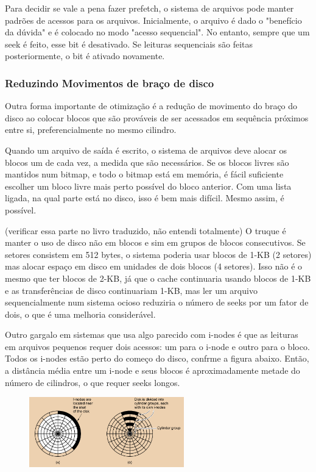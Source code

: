 \documentclass{article}
\begin{document}
Para decidir se vale a pena fazer prefetch, o sistema de arquivos pode manter padrões de acessos para os arquivos. Inicialmente, o arquivo é dado o "benefício da dúvida" e é colocado no modo "acesso sequencial". No entanto, sempre que um seek é feito, esse bit é desativado. Se leituras sequenciais são feitas posteriormente, o bit é ativado novamente.

\subsubsection{Reduzindo Movimentos de braço de disco}

Outra forma importante de otimização é a redução de movimento do braço do disco ao colocar blocos que são prováveis de ser acessados em sequência próximos entre si, preferencialmente no mesmo cilindro.

Quando um arquivo de saída é escrito, o sistema de arquivos deve alocar os blocos um de cada vez, a medida que são necessários. Se os blocos livres são mantidos num bitmap, e todo o bitmap está em memória, é fácil suficiente escolher um bloco livre mais perto possível do bloco anterior. Com uma lista ligada, na qual parte está no disco, isso é bem mais difícil. Mesmo assim, é possível.

(verificar essa parte no livro traduzido, não entendi totalmente)
O truque é manter o uso de disco não em blocos e sim em grupos de blocos consecutivos. Se setores consistem em 512 bytes, o sistema poderia usar blocos de 1-KB (2 setores) mas alocar espaço em disco em unidades de dois blocos (4 setores). Isso não é o mesmo que ter blocos de 2-KB, já que o cache continuaria usando blocos de 1-KB e as transferências de disco continuariam 1-KB, mas ler um arquivo sequencialmente num sistema ocioso reduziria o número de seeks por um fator de dois, o que é uma melhoria considerável.

Outro gargalo em sistemas que usa algo parecido com i-nodes é que as leituras em arquivos pequenos requer dois acessos: um para o i-node e outro para o bloco. Todos os i-nodes estão perto do começo do disco, confrme a figura abaixo. Então, a distância média entre um i-node e seus blocos é aproximadamente metade do número de cilindros, o que requer seeks longos.

\begin{figure}[h]
  \begin{center}
    \includegraphics[width=0.6\textwidth]{img/5-21.png}
  \end{center}
  \caption{}
  \label{fig:}
\end{figure}
\end{document}
